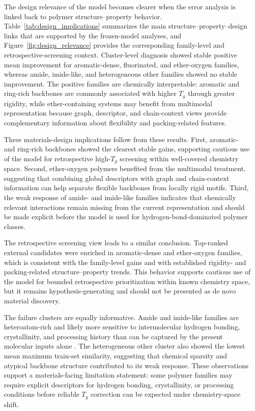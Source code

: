 \documentclass[review,12pt]{elsarticle}
\begin{document}
The design relevance of the model becomes clearer when the error analysis is linked back to polymer structure--property behavior. Table~\ref{tab:design_implications} summarizes the main structure--property--design links that are supported by the frozen-model analyses, and Figure~\ref{fig:design_relevance} provides the corresponding family-level and retrospective-screening context. Cluster-level diagnosis showed stable positive mean improvement for aromatic-dense, fluorinated, and ether-oxygen families, whereas amide, imide-like, and heterogeneous other families showed no stable improvement. The positive families are chemically interpretable: aromatic and ring-rich backbones are commonly associated with higher $T_g$ through greater rigidity, while ether-containing systems may benefit from multimodal representation because graph, descriptor, and chain-context views provide complementary information about flexibility and packing-related features.

Three materials-design implications follow from these results. First, aromatic- and ring-rich backbones showed the clearest stable gains, supporting cautious use of the model for retrospective high-$T_g$ screening within well-covered chemistry space. Second, ether-oxygen polymers benefited from the multimodal treatment, suggesting that combining global descriptors with graph and chain-context information can help separate flexible backbones from locally rigid motifs. Third, the weak response of amide- and imide-like families indicates that chemically relevant interactions remain missing from the current representation and should be made explicit before the model is used for hydrogen-bond-dominated polymer classes.

The retrospective screening view leads to a similar conclusion. Top-ranked external candidates were enriched in aromatic-dense and ether-oxygen families, which is consistent with the family-level gains and with established rigidity- and packing-related structure--property trends. This behavior supports cautious use of the model for bounded retrospective prioritization within known chemistry space, but it remains hypothesis-generating and should not be presented as de novo material discovery.

The failure clusters are equally informative. Amide and imide-like families are heteroatom-rich and likely more sensitive to intermolecular hydrogen bonding, crystallinity, and processing history than can be captured by the present molecular inputs alone \cite{kuo2008hydrogenbonding}. The heterogeneous other cluster also showed the lowest mean maximum train-set similarity, suggesting that chemical sparsity and atypical backbone structure contributed to its weak response. These observations support a materials-facing limitation statement: some polymer families may require explicit descriptors for hydrogen bonding, crystallinity, or processing conditions before reliable $T_g$ correction can be expected under chemistry-space shift.
\end{document}
